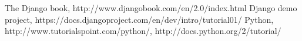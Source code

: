 \begin{thebibliography}{9}
\bibitem{} The Django book, http://www.djangobook.com/en/2.0/index.html
\bibitem{} Django demo project, https://docs.djangoproject.com/en/dev/intro/tutorial01/
\bibitem{} Python, http://www.tutorialspoint.com/python/, http://docs.python.org/2/tutorial/
\end{thebibliography}
